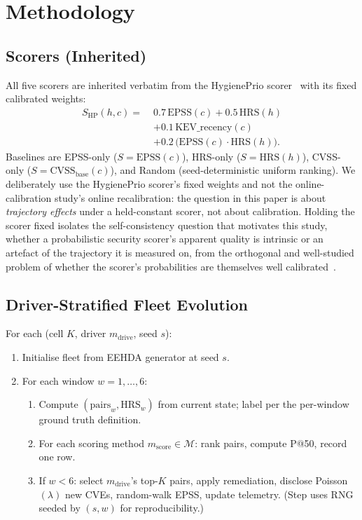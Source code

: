 \section{Methodology}

\subsection{Scorers (Inherited)}

All five scorers are inherited verbatim from the HygienePrio scorer~\cite{paper4hygieneprio}
with its fixed calibrated weights:
\begin{equation}
\begin{aligned}
S_{\mathrm{HP}}(h,c) =\;& 0.7\,\mathrm{EPSS}(c) + 0.5\,\mathrm{HRS}(h) \\
 & + 0.1\,\mathrm{KEV\_recency}(c) \\
 & + 0.2\,\bigl(\mathrm{EPSS}(c) \cdot \mathrm{HRS}(h)\bigr).
\end{aligned}
\end{equation}
Baselines are EPSS-only ($S = \mathrm{EPSS}(c)$), HRS-only ($S = \mathrm{HRS}(h)$),
CVSS-only ($S = \mathrm{CVSS}_{\mathrm{base}}(c)$), and Random
(seed-deterministic uniform ranking). We deliberately use the HygienePrio scorer's
fixed weights and not the online-calibration study's online recalibration: the question
in this paper is about \textit{trajectory effects} under a held-constant
scorer, not about calibration. Holding the scorer fixed isolates the
self-consistency question that motivates this study, whether a
probabilistic security scorer's apparent quality is intrinsic or an
artefact of the trajectory it is measured on, from the orthogonal and
well-studied problem of whether the scorer's probabilities are themselves
well calibrated~\cite{guo2017calibration,niculescu2005predicting}.

\subsection{Driver-Stratified Fleet Evolution}

For each (cell $K$, driver $m_{\text{drive}}$, seed $s$):
\begin{enumerate}
\item Initialise fleet from EEHDA generator at seed $s$.
\item For each window $w = 1, \ldots, 6$:
\begin{enumerate}
\item Compute $(\text{pairs}_w, \text{HRS}_w)$ from current state;
label per the per-window ground truth definition.
\item For each scoring method $m_{\text{score}} \in \mathcal{M}$:
rank pairs, compute P@50, record one row.
\item If $w < 6$: select $m_{\text{drive}}$'s top-$K$ pairs, apply
remediation, disclose Poisson$(\lambda)$ new CVEs, random-walk EPSS,
update telemetry. (Step uses RNG seeded by $(s, w)$ for reproducibility.)
\end{enumerate}
\end{enumerate}

